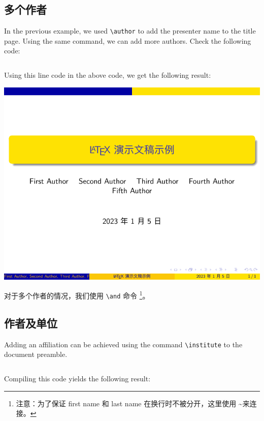 \subsection{多个作者}

In the previous example, we used \verb|\author| to add the presenter name to the title page. Using the same command, we can add more authors. Check the following code:

\inputminted[linenos=true]{latex}{examples/beamer/beamertitle02.tex}

Using this line code in the above code, we get the following result:

\includegraphics{examples/beamer/beamertitle02.pdf}

对于多个作者的情况，我们使用 \verb|\and| 命令
\footnote{注意：为了保证 first name 和 last name 在换行时不被分开，这里使用 \textasciitilde 来连接。}。

\subsection{作者及单位}

Adding an affiliation can be achieved using the command \verb|\institute| to the document preamble.

\inputminted[linenos=true]{latex}{examples/beamer/beamertitle03.tex}

Compiling this code yields the following result:

